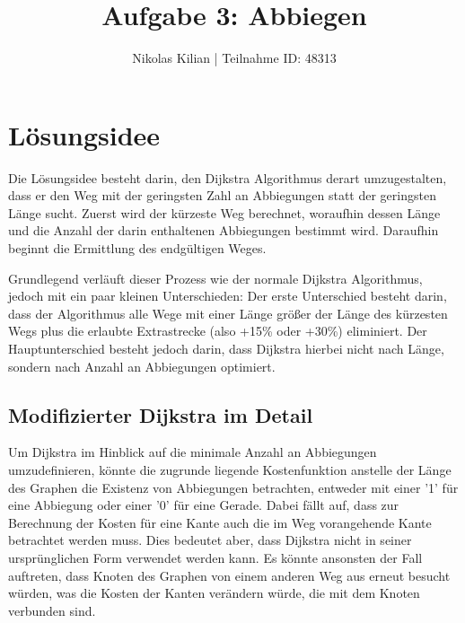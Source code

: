 \documentclass{article}
\newcommand{\Ftitle}{Aufgabe 3: Abbiegen}
\newcommand{\Fauthor}{Nikolas Kilian | Teilnahme ID: 48313}
\begin{document}
\title{\Ftitle}
\author{\Fauthor}
    
\maketitle

\tableofcontents

\section{Lösungsidee}

Die Lösungsidee besteht darin, den Dijkstra Algorithmus derart umzugestalten, dass er den Weg mit der geringsten Zahl an Abbiegungen statt der geringsten Länge sucht.
Zuerst wird der kürzeste Weg berechnet, woraufhin dessen Länge und die Anzahl der darin enthaltenen Abbiegungen bestimmt wird. Daraufhin beginnt die Ermittlung des endgültigen Weges.

Grundlegend verläuft dieser Prozess wie der normale Dijkstra Algorithmus, jedoch mit ein paar kleinen Unterschieden:
Der erste Unterschied besteht darin, dass der Algorithmus alle Wege mit einer Länge größer der Länge des kürzesten Wegs plus die erlaubte Extrastrecke (also +15\% oder +30\%) eliminiert.
Der Hauptunterschied besteht jedoch darin, dass Dijkstra hierbei nicht nach Länge, sondern nach Anzahl an Abbiegungen optimiert.

\subsection{Modifizierter Dijkstra im Detail}

Um Dijkstra im Hinblick auf die minimale Anzahl an Abbiegungen umzudefinieren, könnte die zugrunde liegende Kostenfunktion anstelle der Länge des Graphen die Existenz von Abbiegungen betrachten, entweder mit einer '1' für eine Abbiegung oder einer '0' für eine Gerade. 
Dabei fällt auf, dass zur Berechnung der Kosten für eine Kante auch die im Weg vorangehende Kante betrachtet werden muss.
Dies bedeutet aber, dass Dijkstra nicht in seiner ursprünglichen Form verwendet werden kann. Es könnte ansonsten der Fall auftreten, dass Knoten des Graphen von einem anderen Weg aus erneut besucht würden, was die Kosten der Kanten verändern würde, die mit dem Knoten verbunden sind.
\end{document}
